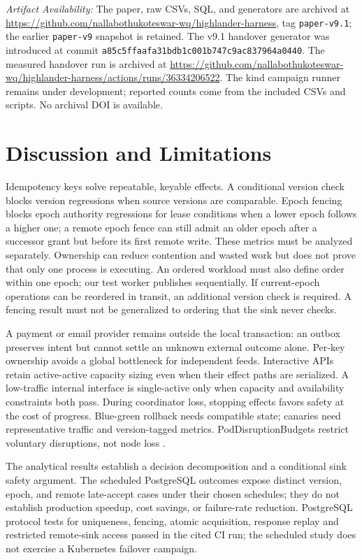 \documentclass[conference,10pt]{IEEEtran}
\begin{document}
\textit{Artifact Availability:} The paper, raw CSVs, SQL, and generators are archived at \url{https://github.com/nallabothukoteswar-wq/highlander-harness}, tag \texttt{paper-v9.1}; the earlier \texttt{paper-v9} snapshot is retained. The v9.1 handover generator was introduced at commit \texttt{a85c5ffaafa31bdb1c001b747c9ac837964a0440}. The measured handover run is archived at \url{https://github.com/nallabothukoteswar-wq/highlander-harness/actions/runs/36334206522}. The kind campaign runner remains under development; reported counts come from the included CSVs and scripts. No archival DOI is available.

\section{Discussion and Limitations}
Idempotency keys solve repeatable, keyable effects. A conditional version check blocks version regressions when source versions are comparable. Epoch fencing blocks epoch authority regressions for lease conditions when a lower epoch follows a higher one; a remote epoch fence can still admit an older epoch after a successor grant but before its first remote write. These metrics must be analyzed separately. Ownership can reduce contention and wasted work but does not prove that only one process is executing. An ordered workload must also define order within one epoch; our test worker publishes sequentially. If current-epoch operations can be reordered in transit, an additional version check is required. A fencing result must not be generalized to ordering that the sink never checks.

A payment or email provider remains outside the local transaction: an outbox preserves intent but cannot settle an unknown external outcome alone. Per-key ownership avoids a global bottleneck for independent feeds. Interactive APIs retain active-active capacity sizing even when their effect paths are serialized. A low-traffic internal interface is single-active only when capacity and availability constraints both pass. During coordinator loss, stopping effects favors safety at the cost of progress. Blue-green rollback needs compatible state; canaries need representative traffic and version-tagged metrics. PodDisruptionBudgets restrict voluntary disruptions, not node loss \cite{r23}.

The analytical results establish a decision decomposition and a conditional sink safety argument. The scheduled PostgreSQL outcomes expose distinct version, epoch, and remote late-accept cases under their chosen schedules; they do not establish production speedup, cost savings, or failure-rate reduction. PostgreSQL protocol tests for uniqueness, fencing, atomic acquisition, response replay and restricted remote-sink access passed in the cited CI run; the scheduled study does not exercise a Kubernetes failover campaign.
\end{document}
